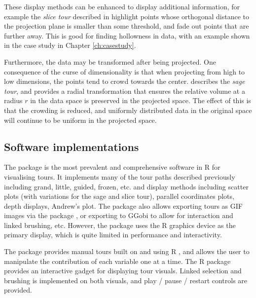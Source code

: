 These display methods can be enhanced to display additional information,
for example the \emph{slice tour} described in \citep{laa2020slice}
highlight points whose orthogonal distance to the projection plane is
smaller than some threshold, and fade out points that are further away.
This is good for finding hollowness in data, with an example shown in
the case study in Chapter \ref{ch:casestudy}.

Furthermore, the data may be transformed after being projected. One
consequence of the curse of dimensionality is that when projecting from
high to low dimensions, the points tend to crowd towards the center.
\citep{laa2021burning} describes the \emph{sage tour}, and provides a
radial transformation that ensures the relative volume at a radius \(r\)
in the data space is preserved in the projected space. The effect of
this is that the crowding is reduced, and uniformly distributed data in
the original space will continue to be uniform in the projected space.

\hypertarget{software-implementations}{%
\subsection{Software implementations}\label{software-implementations}}

The  package \citep{wickham2011tourr} is the most
prevalent and comprehensive software in R \citep{R} for visualising
tours. It implements many of the tour paths described previously
including grand, little, guided, frozen, etc. and display methods
including scatter plots (with variations for the sage and slice tour),
parallel coordinates plots, depth displays, Andrew's plot. The package
also allows exporting tours as GIF images via the 
package \citep{gifski}, or exporting to GGobi \citep{swayne2003ggobi} to
allow for interaction and linked brushing, etc. However, the
 package uses the R graphics device as the primary
display, which is quite limited in performance and interactivity.

The  package \citep{spinifex} provides manual tours
built on  and using R  \citep{shiny}, and
allows the user to manipulate the contribution of each variable one at a
time. The  R package \citep{lee2021liminal} provides an
interactive gadget for displaying tour visuals. Linked selection and
brushing is implemented on both visuals, and play / pause / restart
controls are provided.

